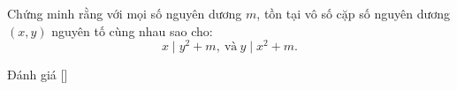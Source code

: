 \ifshowproblem
\begin{problem}\label{problem:BGR-2015-EGMO-TST-P4}
	Chứng minh rằng với mọi số nguyên dương \( m \), tồn tại vô số cặp số nguyên dương \( (x, y) \) nguyên tố cùng nhau sao cho:
	\[ x \mid y^2 + m,\ \text{và}\ y \mid x^2 + m. \]
\end{problem}
\fi

\ifshowinfo
Đánh giá [\textbf{}]\footnotemark
{}
\fi